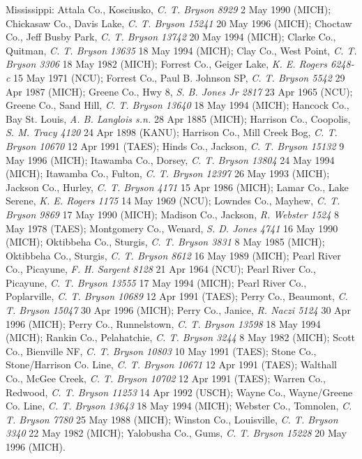 \documentclass{article}
\begin{document}
Mississippi:
Attala Co., Kosciusko, \textit{C. T. Bryson 8929} 2 May 1990 (MICH);
Chickasaw Co., Davis Lake, \textit{C. T. Bryson 15241} 20 May 1996 (MICH);
Choctaw Co., Jeff Busby Park, \textit{C. T. Bryson 13742} 20 May 1994 (MICH);
Clarke Co., Quitman, \textit{C. T. Bryson 13635} 18 May 1994 (MICH);
Clay Co., West Point, \textit{C. T. Bryson 3306} 18 May 1982 (MICH);
Forrest Co., Geiger Lake, \textit{K. E. Rogers 6248-c} 15 May 1971 (NCU);
Forrest Co., Paul B. Johnson SP, \textit{C. T. Bryson 5542} 29 Apr 1987 (MICH);
Greene Co., Hwy 8, \textit{S. B. Jones Jr 2817} 23 Apr 1965 (NCU);
Greene Co., Sand Hill, \textit{C. T. Bryson 13640} 18 May 1994 (MICH);
Hancock Co., Bay St. Louis, \textit{A. B. Langlois s.n.} 28 Apr 1885 (MICH);
Harrison Co., Coopolis, \textit{S. M. Tracy 4120} 24 Apr 1898 (KANU);
Harrison Co., Mill Creek Bog, \textit{C. T. Bryson 10670} 12 Apr 1991 (TAES);
Hinds Co., Jackson, \textit{C. T. Bryson 15132} 9 May 1996 (MICH);
Itawamba Co., Dorsey, \textit{C. T. Bryson 13804} 24 May 1994 (MICH);
Itawamba Co., Fulton, \textit{C. T. Bryson 12397} 26 May 1993 (MICH);
Jackson Co., Hurley, \textit{C. T. Bryson 4171} 15 Apr 1986 (MICH);
Lamar Co., Lake Serene, \textit{K. E. Rogers 1175} 14 May 1969 (NCU);
Lowndes Co., Mayhew, \textit{C. T. Bryson 9869} 17 May 1990 (MICH);
Madison Co., Jackson, \textit{R. Webster 1524} 8 May 1978 (TAES);
Montgomery Co., Wenard, \textit{S. D. Jones 4741} 16 May 1990 (MICH);
Oktibbeha Co., Sturgis, \textit{C. T. Bryson 3831} 8 May 1985 (MICH);
Oktibbeha Co., Sturgis, \textit{C. T. Bryson 8612} 16 May 1989 (MICH);
Pearl River Co., Picayune, \textit{F. H. Sargent 8128} 21 Apr 1964 (NCU);
Pearl River Co., Picayune, \textit{C. T. Bryson 13555} 17 May 1994 (MICH);
Pearl River Co., Poplarville, \textit{C. T. Bryson 10689} 12 Apr 1991 (TAES);
Perry Co., Beaumont, \textit{C. T. Bryson 15047} 30 Apr 1996 (MICH);
Perry Co., Janice, \textit{R. Naczi 5124} 30 Apr 1996 (MICH);
Perry Co., Runnelstown, \textit{C. T. Bryson 13598} 18 May 1994 (MICH);
Rankin Co., Pelahatchie, \textit{C. T. Bryson 3244} 8 May 1982 (MICH);
Scott Co., Bienville NF, \textit{C. T. Bryson 10803} 10 May 1991 (TAES);
Stone Co., Stone/Harrison Co. Line, \textit{C. T. Bryson 10671} 12 Apr 1991 (TAES);
Walthall Co., McGee Creek, \textit{C. T. Bryson 10702} 12 Apr 1991 (TAES);
Warren Co., Redwood, \textit{C. T. Bryson 11253} 14 Apr 1992 (USCH);
Wayne Co., Wayne/Greene Co. Line, \textit{C. T. Bryson 13643} 18 May 1994 (MICH);
Webster Co., Tomnolen, \textit{C. T. Bryson 7780} 25 May 1988 (MICH);
Winston Co., Louisville, \textit{C. T. Bryson 3340} 22 May 1982 (MICH);
Yalobusha Co., Gums, \textit{C. T. Bryson 15228} 20 May 1996 (MICH).
\end{document}
